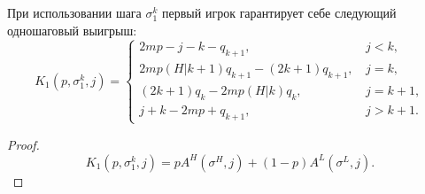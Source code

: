 \begin{prop}
\label{prop:lower_bound:general_step}
При использовании шага $ \sigma^k_1 $ первый игрок гарантирует себе следующий одношаговый выигрыш:
\begin{equation}
\label{eq:lower_bound:general_step}
K_1(p, \sigma^k_1, j) = \begin{cases}
    2mp - j - k - q_{k+1}, &\, j < k,\\
    2mp(H|k+1)q_{k+1} - (2k+1)q_{k+1}, &\, j = k,\\
    (2k + 1)q_k - 2mp(H|k)q_k, &\, j = k+1,\\
    j + k - 2mp + q_{k+1}, &\, j > k + 1.
\end{cases}
\end{equation}
\end{prop}
\begin{proof}
\begin{equation}
\label{eq:payoff:stage}
    K_1(p, \sigma^k_1, j) = pA^H(\sigma^H, j) + (1-p)A^L(\sigma^L, j).
\end{equation}


\end{proof}
